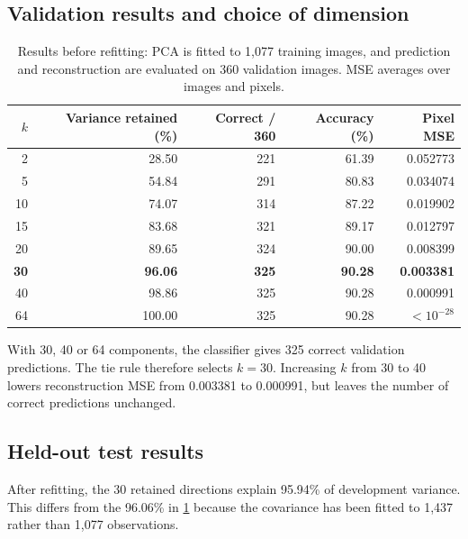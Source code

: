 \documentclass[11pt,a4paper,english]{article}
\numberwithin{equation}{section}
\begin{document}
\subsection{Validation results and choice of dimension}
\begin{table}[htbp]
\centering
\caption{Results before refitting: PCA is fitted to 1,077 training images, and prediction and reconstruction are evaluated on 360 validation images. MSE averages over images and pixels.}
\label{tab:validation}
\small
\begin{tabular}{@{}rrrrr@{}}
\toprule
$k$ & Variance retained (\%) & Correct / 360 & Accuracy (\%) & Pixel MSE \\
\midrule
2  & 28.50 & 221 & 61.39 & 0.052773 \\
5  & 54.84 & 291 & 80.83 & 0.034074 \\
10 & 74.07 & 314 & 87.22 & 0.019902 \\
15 & 83.68 & 321 & 89.17 & 0.012797 \\
20 & 89.65 & 324 & 90.00 & 0.008399 \\
\textbf{30} & \textbf{96.06} & \textbf{325} & \textbf{90.28} & \textbf{0.003381} \\
40 & 98.86 & 325 & 90.28 & 0.000991 \\
64 & 100.00 & 325 & 90.28 & $<10^{-28}$ \\
\bottomrule
\end{tabular}
\end{table}
With 30, 40 or 64 components, the classifier gives 325 correct validation predictions. The tie rule therefore selects $k=30$. Increasing $k$ from 30 to 40 lowers reconstruction MSE from 0.003381 to 0.000991, but leaves the number of correct predictions unchanged.

\subsection{Held-out test results}
After refitting, the 30 retained directions explain 95.94\% of development variance. This differs from the 96.06\% in \cref{tab:validation} because the covariance has been fitted to 1,437 rather than 1,077 observations.
\end{document}
